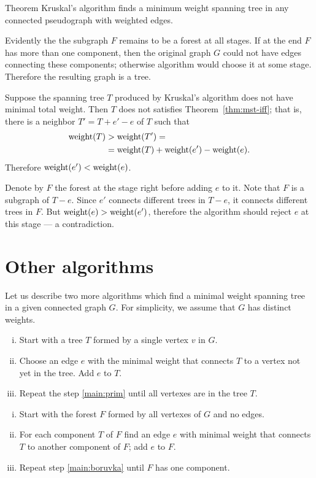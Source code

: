 \begin{thm}{Theorem}\label{thm:kruskal}
Kruskal’s algorithm finds a minimum weight spanning tree in any connected pseudograph with weighted edges.
\end{thm}

Evidently the the subgraph $F$ remains to be a forest at all stages.
If at the end $F$ has more than one component, then the original graph $G$ could not have edges connecting these components;
otherwise algorithm would choose it at some stage.
Therefore the resulting graph is a tree.

Suppose the spanning tree $T$ produced by Kruskal’s algorithm does not have minimal total weight.
Then $T$ does not satisfies Theorem~\ref{thm:mst-iff};
that is, there is a neighbor $T'=T+e'-e$ of $T$ such that 
\begin{align*}
\mathop{\rm weight}\nolimits(T)&>\mathop{\rm weight}\nolimits(T')=
\\
&=\mathop{\rm weight}\nolimits(T)+\mathop{\rm weight}\nolimits(e')-\mathop{\rm weight}\nolimits(e).
\end{align*}
Therefore $\mathop{\rm weight}\nolimits(e')<\mathop{\rm weight}\nolimits(e)$.

Denote by $F$ the forest at the stage right before adding $e$ to it.
Note that $F$ is a subgraph of $T-e$.
Since $e'$ connects different trees in $T-e$,
it connects different trees in $F$.
But $\mathop{\rm weight}\nolimits(e)>\mathop{\rm weight}\nolimits(e')$, therefore the algorithm should reject $e$ at this stage --- a contradiction.
\qeds

\section*{Other algorithms}

Let us describe two more algorithms which find  a minimal weight spanning tree in a given connected graph $G$.
For simplicity, we assume that $G$ has distinct weights.

\begin{enumerate}[(i)]
\item Start with a tree $T$ formed by a single vertex $v$ in $G$.
\item\label{main:prim} Choose an edge $e$ with the minimal weight that connects $T$ to a vertex not yet in the tree.
Add $e$ to $T$.
\item Repeat the step \ref{main:prim} until all vertexes are in the tree $T$.
\end{enumerate}

\begin{enumerate}[(i)]
\item Start with the forest $F$ formed by all vertexes of $G$ and no edges.
\item\label{main:boruvka} For each component $T$ of $F$ find an edge $e$ with minimal weight that connects $T$ to another component of $F$; add $e$ to $F$.
\item Repeat step \ref{main:boruvka} until $F$ has one component. 
\end{enumerate}


